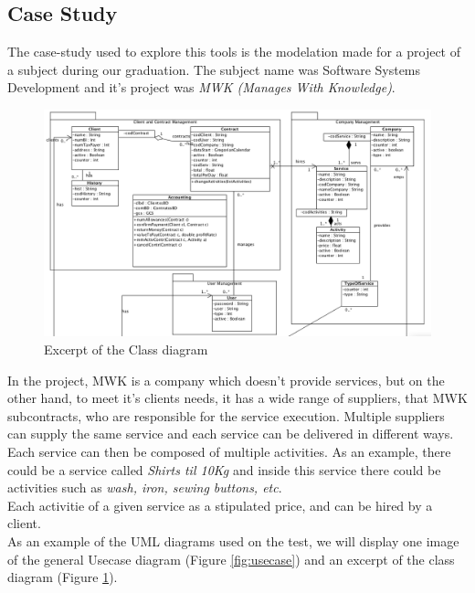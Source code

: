 \subsection*{Case Study}
The case-study used to explore this tools is the modelation made for a project of a subject during our graduation.
The subject name was Software Systems Development and it's project was \textit{MWK (Manages With Knowledge)}.\\
\begin{figure}[!htbp]
\begin{center}
\includegraphics[scale=0.35]{images/classbw.png}
\caption{Excerpt of the Class diagram}\label{fig:class}
\end{center}
\end{figure} 
In the project, MWK is a company which doesn't provide services, but on the other hand, to meet it's clients needs,
it has a wide range of suppliers, that MWK subcontracts, who are responsible for the service execution.
Multiple suppliers can supply the same service and each  service can be delivered in different ways.
Each service can then be composed of multiple activities. As an example, there could be a service called \textit{Shirts til 10Kg}
and inside this service there could be activities such as \textit{wash, iron, sewing buttons, etc}.\\
Each activitie of a given service as a stipulated price, and can be hired by a client.\\
As an example of the UML diagrams used on the test, we will display one image of the general Usecase diagram (Figure \ref{fig:usecase}) and an excerpt of the class diagram (Figure \ref{fig:class}).
